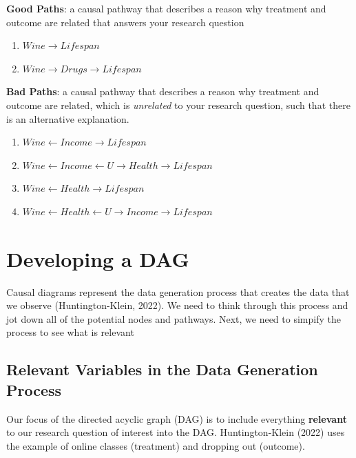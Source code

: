 \documentclass[
]{book}
\providecommand{\tightlist}{%
  \setlength{\itemsep}{0pt}\setlength{\parskip}{0pt}}
\begin{document}
\textbf{Good Paths}: a causal pathway that describes a reason why treatment and outcome are related that answers your research question

\begin{enumerate}
\def\labelenumi{\arabic{enumi}.}
\tightlist
\item
  \(Wine \rightarrow Lifespan\)
\item
  \(Wine \rightarrow Drugs \rightarrow Lifespan\)
\end{enumerate}

\textbf{Bad Paths}: a causal pathway that describes a reason why treatment and outcome are related, which is \emph{unrelated} to your research question, such that there is an alternative explanation.

\begin{enumerate}
\def\labelenumi{\arabic{enumi}.}
\tightlist
\item
  \(Wine \leftarrow Income \rightarrow Lifespan\)
\item
  \(Wine \leftarrow Income \leftarrow U \rightarrow Health \rightarrow Lifespan\)
\item
  \(Wine \leftarrow Health \rightarrow Lifespan\)
\item
  \(Wine \leftarrow Health \leftarrow U \rightarrow Income \rightarrow Lifespan\)
\end{enumerate}

\chapter{Developing a DAG}\label{developing-a-dag}

Causal diagrams represent the data generation process that creates the data that we observe (Huntington-Klein, 2022). We need to think through this process and jot down all of the potential nodes and pathways. Next, we need to simpify the process to see what is relevant

\section{Relevant Variables in the Data Generation Process}\label{relevant-variables-in-the-data-generation-process}

Our focus of the directed acyclic graph (DAG) is to include everything \textbf{relevant} to our research question of interest into the DAG. Huntington-Klein (2022) uses the example of online classes (treatment) and dropping out (outcome).
\end{document}
